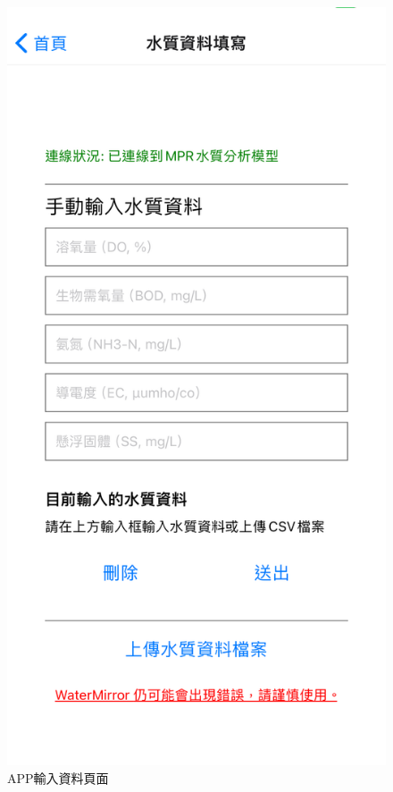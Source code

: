 \documentclass[12pt,a4paper]{article}
\begin{document}
\begin{enumerate}
\begin{enumerate}[label=\arabic*.]
\begin{enumerate}[label=3-2-\arabic*.]
\begin{figure}[H]
\begin{minipage}{0.35\textwidth}
                    \centering
                    \includegraphics[width=\textwidth]{resources/image/front-end/APP輸入資料.png}
                    \caption{APP輸入資料頁面}
                \end{minipage}
                

\end{figure}
\end{enumerate}
\end{enumerate}
\end{enumerate}
\end{document}
